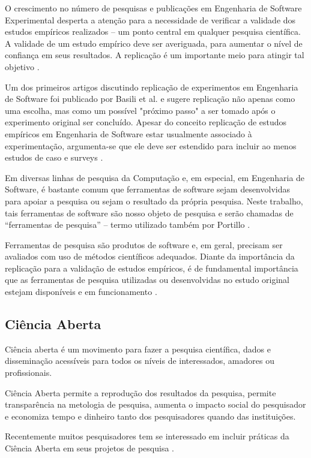 \documentclass[12pt]{article}
\begin{document}
O crescimento no número de pesquisas e publicações em Engenharia de Software
Experimental desperta a atenção para a necessidade de verificar a validade dos
estudos empíricos realizados -- um ponto central em qualquer pesquisa
científica. A validade de um estudo empírico  deve ser averiguada, para
aumentar o nível de confiança em seus resultados. A replicação é um importante
meio para atingir tal objetivo \cite{Almqvist2006}.

Um dos primeiros artigos discutindo replicação de experimentos em Engenharia
de Software foi publicado por Basili et al. \cite{Mantyla2010} e sugere
replicação não apenas como uma escolha, mas como um possível "próximo passo" a
ser tomado após o experimento original ser concluído. Apesar do conceito
replicação de estudos empíricos em Engenharia de Software estar usualmente
associado à experimentação, argumenta-se que ele deve ser estendido para
incluir ao menos estudos de caso e surveys \cite{Basili1986}.

Em diversas linhas de pesquisa da Computação e, em especial, em Engenharia de
Software, é bastante comum que ferramentas de software sejam desenvolvidas
para apoiar a pesquisa ou sejam o resultado da própria pesquisa. Neste
trabalho, tais ferramentas de software são nosso objeto de pesquisa e serão
chamadas de “ferramentas de pesquisa” -- termo utilizado também por Portillo
\cite{Portillo12}.

Ferramentas de pesquisa são produtos de software e, em geral, precisam ser
avaliados com uso de métodos científicos adequados. Diante da importância da
replicação para a validação de estudos empíricos, é de fundamental importância
que as ferramentas de pesquisa utilizadas ou desenvolvidas no estudo original
estejam disponíveis e em funcionamento \cite{Kon2011}.

\subsection{Ciência Aberta}

Ciência aberta é um movimento para fazer a pesquisa científica, dados e
disseminação acessíveis para todos os níveis de interessados, amadores ou
profissionais.

Ciência Aberta permite a reprodução dos resultados da pesquisa, permite
transparência na metologia de pesquisa, aumenta o impacto social do
pesquisador e economiza tempo e dinheiro tanto dos pesquisadores quando das
instituições\cite{Nesta2010}.

Recentemente muitos pesquisadores tem se interessado em incluir práticas da
Ciência Aberta em seus projetos de pesquisa\cite{Grand2010}
\cite{Grand2010Open}.
\end{document}
